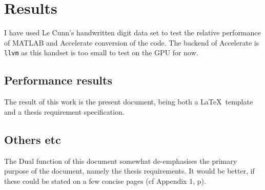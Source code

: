 \chapter{Results}\label{ch:results}

I have used Le Cunn's handwritten digit data set to test the relative performance of MATLAB and Accelerate conversion of the code. The backend of Accelerate is \texttt{llvm} as this handset is too small to test on the GPU for now. 

\section{Performance results}

The result of this work is the present document, being both a \LaTeX\
template and a thesis requirement specification.

\section{Others etc}

The Dual function of this document somewhat de-emphasises the primary
purpose of the document, namely the thesis requirements.  It would be
better, if these could be stated on a few concise pages (cf Appendix
1, p\pageref{app1}).
